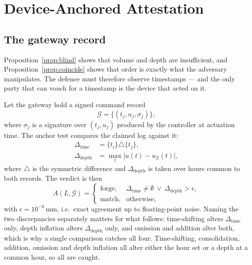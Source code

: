 \section{Device-Anchored Attestation}
\label{sec:anchor}

\subsection{The gateway record}

Proposition~\ref{prop:blind} shows that volume and depth are insufficient, and
Proposition~\ref{prop:coincide} shows that order is exactly what the adversary
manipulates. The defence must therefore observe timestamps --- and the only party
that can vouch for a timestamp is the device that acted on it.

Let the gateway hold a signed command record
\begin{equation}
\mathcal{G}=\{(t_j,u_j,\sigma_j)\},
\label{eq:gateway}
\end{equation}
where $\sigma_j$ is a signature over $(t_j,u_j)$ produced by the controller at
actuation time. The anchor test compares the claimed log against it:
\begin{equation}
\begin{aligned}
\Delta_{\mathrm{time}}&=\{t_i\}\triangle\{t_j\},\\
\Delta_{\mathrm{depth}}&=\max_{t}\bigl|u(t)-u_{\mathcal{G}}(t)\bigr|,
\end{aligned}
\label{eq:deltas}
\end{equation}
where $\triangle$ is the symmetric difference and $\Delta_{\mathrm{depth}}$ is
taken over hours common to both records. The verdict is then
\begin{equation}
A(L,\mathcal{G})=
\begin{cases}
\text{forge}, & \Delta_{\mathrm{time}}\neq\emptyset
\ \vee\ \Delta_{\mathrm{depth}}>\epsilon,\\
\text{match}, & \text{otherwise},
\end{cases}
\label{eq:anchor}
\end{equation}
with $\epsilon=10^{-6}$\,mm, i.e.\ exact agreement up to floating-point noise.
Naming the two discrepancies separately matters for what follows: time-shifting
alters $\Delta_{\mathrm{time}}$ only, depth inflation alters
$\Delta_{\mathrm{depth}}$ only, and omission and addition alter both, which is
why a single comparison catches all four.
Time-shifting, consolidation, addition, omission and depth inflation all alter
either the hour set or a depth at a common hour, so all are caught.

